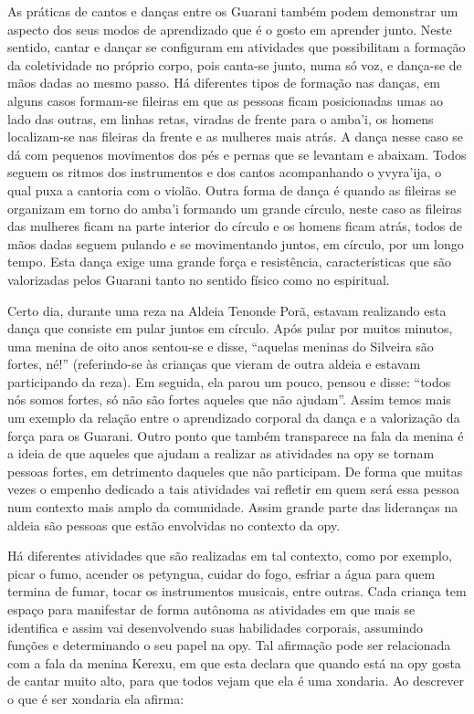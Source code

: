 \documentclass{article}
\begin{document}
As pr\'aticas de cantos e dan\c{c}as entre os Guarani tamb\'em podem
demonstrar um aspecto dos seus modos de aprendizado que \'e o gosto em
aprender junto. Neste sentido, cantar e dan\c{c}ar se configuram em
atividades que possibilitam a forma\c{c}\~ao da coletividade no
pr\'oprio corpo, pois canta-se junto, numa s\'o voz, e dan\c{c}a-se de
m\~aos dadas ao mesmo passo. H\'a diferentes tipos de forma\c{c}\~ao
nas dan\c{c}as, em alguns casos formam-se fileiras em que as pessoas
ficam posicionadas umas ao lado das outras, em linhas retas, viradas de
frente para o amba{\textquoteright}i, os homens localizam-se nas
fileiras da frente e as mulheres mais atr\'as. A dan\c{c}a nesse caso
se d\'a com pequenos movimentos dos p\'es e pernas que se levantam e
abaixam. Todos seguem os ritmos dos instrumentos e dos cantos
acompanhando o yvyra{\textquoteright}ija, o qual puxa a cantoria com o
viol\~ao. Outra forma de dan\c{c}a \'e quando as fileiras se organizam
em torno do amba{\textquoteright}i formando um grande c\'irculo, neste
caso as fileiras das mulheres ficam na parte interior do c\'irculo e os
homens ficam atr\'as, todos de m\~aos dadas seguem pulando e se
movimentando juntos, em c\'irculo, por um longo tempo. Esta dan\c{c}a
exige uma grande for\c{c}a e resist\^encia, caracter\'isticas que s\~ao
valorizadas pelos Guarani tanto no sentido f\'isico como no espiritual.

Certo dia, durante uma reza na Aldeia Tenonde Por\~a, estavam realizando
esta dan\c{c}a que consiste em pular juntos em c\'irculo. Ap\'os pular
por muitos minutos, uma menina de oito anos sentou-se e disse,
{\textquotedblleft}aquelas meninas do Silveira s\~ao fortes,
n\'e!{\textquotedblright} (referindo-se \`as crian\c{c}as que vieram de
outra aldeia e estavam participando da reza). Em seguida, ela parou um
pouco, pensou e disse: {\textquotedblleft}todos n\'os somos fortes,
s\'o n\~ao s\~ao fortes aqueles que n\~ao ajudam{\textquotedblright}.
Assim temos mais um exemplo da rela\c{c}\~ao entre o aprendizado
corporal da dan\c{c}a e a valoriza\c{c}\~ao da for\c{c}a para os
Guarani. Outro ponto que tamb\'em transparece na fala da menina \'e a
ideia de que aqueles que ajudam a realizar as atividades na opy se
tornam pessoas fortes, em detrimento daqueles que n\~ao participam. De
forma que muitas vezes o empenho dedicado a tais atividades vai
refletir em quem ser\'a essa pessoa num contexto mais amplo da
comunidade. Assim grande parte das lideran\c{c}as na aldeia s\~ao
pessoas que est\~ao envolvidas no contexto da opy.

H\'a diferentes atividades que s\~ao realizadas em tal contexto, como
por exemplo, picar o fumo, acender os petyngua, cuidar do fogo, esfriar
a \'agua para quem termina de fumar, tocar os instrumentos musicais,
entre outras. Cada crian\c{c}a tem espa\c{c}o para manifestar de forma
aut\^onoma as atividades em que mais se identifica e assim vai
desenvolvendo suas habilidades corporais, assumindo fun\c{c}\~oes e
determinando o seu papel na opy. Tal afirma\c{c}\~ao pode ser
relacionada com a fala da menina Kerexu, em que esta declara que quando
est\'a na opy gosta de cantar muito alto, para que todos vejam que ela
\'e uma xondaria. Ao descrever o que \'e ser xondaria ela afirma:
\end{document}
